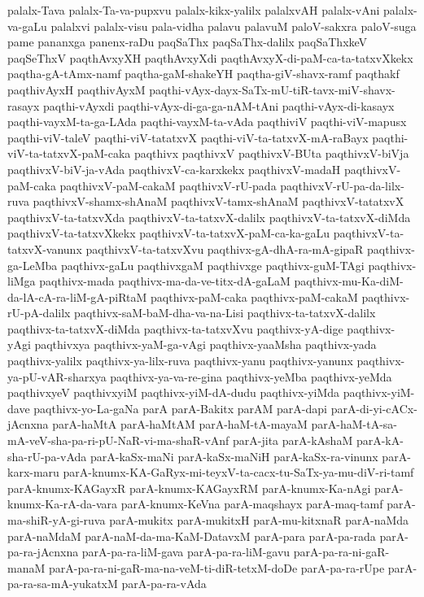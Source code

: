 {palalx-Tava
palalx-Ta-va-pupxvu
palalx-kikx-yalilx
palalxvAH
palalx-vAni
palalx-va-gaLu
palalxvi
palalx-visu
pala-vidha
palavu
palavuM
paloV-sakxra
paloV-suga
pame
pananxga
panenx-raDu
paqSaThx
paqSaThx-dalilx
paqSaThxkeV
paqSeThxV
paqthAvxyXH
paqthAvxyXdi
paqthAvxyX-di-paM-ca-ta-tatxvXkekx
paqtha-gA-tAmx-namf
paqtha-gaM-shakeYH
paqtha-giV-shavx-ramf
paqthakf
paqthivAyxH
paqthivAyxM
paqthi-vAyx-dayx-SaTx-mU-tiR-tavx-miV-shavx-rasayx
paqthi-vAyxdi
paqthi-vAyx-di-ga-ga-nAM-tAni
paqthi-vAyx-di-kasayx
paqthi-vayxM-ta-ga-LAda
paqthi-vayxM-ta-vAda
paqthiviV
paqthi-viV-mapusx
paqthi-viV-taleV
paqthi-viV-tatatxvX
paqthi-viV-ta-tatxvX-mA-raBayx
paqthi-viV-ta-tatxvX-paM-caka
paqthivx
paqthivxV
paqthivxV-BUta
paqthivxV-biVja
paqthivxV-biV-ja-vAda
paqthivxV-ca-karxkekx
paqthivxV-madaH
paqthivxV-paM-caka
paqthivxV-paM-cakaM
paqthivxV-rU-pada
paqthivxV-rU-pa-da-lilx-ruva
paqthivxV-shamx-shAnaM
paqthivxV-tamx-shAnaM
paqthivxV-tatatxvX
paqthivxV-ta-tatxvXda
paqthivxV-ta-tatxvX-dalilx
paqthivxV-ta-tatxvX-diMda
paqthivxV-ta-tatxvXkekx
paqthivxV-ta-tatxvX-paM-ca-ka-gaLu
paqthivxV-ta-tatxvX-vanunx
paqthivxV-ta-tatxvXvu
paqthivx-gA-dhA-ra-mA-gipaR
paqthivx-ga-LeMba
paqthivx-gaLu
paqthivxgaM
paqthivxge
paqthivx-guM-TAgi
paqthivx-liMga
paqthivx-mada
paqthivx-ma-da-ve-titx-dA-gaLaM
paqthivx-mu-Ka-diM-da-lA-cA-ra-liM-gA-piRtaM
paqthivx-paM-caka
paqthivx-paM-cakaM
paqthivx-rU-pA-dalilx
paqthivx-saM-baM-dha-va-na-Lisi
paqthivx-ta-tatxvX-dalilx
paqthivx-ta-tatxvX-diMda
paqthivx-ta-tatxvXvu
paqthivx-yA-dige
paqthivx-yAgi
paqthivxya
paqthivx-yaM-ga-vAgi
paqthivx-yaaMsha
paqthivx-yada
paqthivx-yalilx
paqthivx-ya-lilx-ruva
paqthivx-yanu
paqthivx-yanunx
paqthivx-ya-pU-vAR-sharxya
paqthivx-ya-va-re-gina
paqthivx-yeMba
paqthivx-yeMda
paqthivxyeV
paqthivxyiM
paqthivx-yiM-dA-dudu
paqthivx-yiMda
paqthivx-yiM-dave
paqthivx-yo-La-gaNa
parA
parA-Bakitx
parAM
parA-dapi
parA-di-yi-cACx-jAcnxna
parA-haMtA
parA-haMtAM
parA-haM-tA-mayaM
parA-haM-tA-sa-mA-veV-sha-pa-ri-pU-NaR-vi-ma-shaR-vAnf
parA-jita
parA-kAshaM
parA-kA-sha-rU-pa-vAda
parA-kaSx-maNi
parA-kaSx-maNiH
parA-kaSx-ra-vinunx
parA-karx-maru
parA-knumx-KA-GaRyx-mi-teyxV-ta-cacx-tu-SaTx-ya-mu-diV-ri-tamf
parA-knumx-KAGayxR
parA-knumx-KAGayxRM
parA-knumx-Ka-nAgi
parA-knumx-Ka-rA-da-vara
parA-knumx-KeVna
parA-maqshayx
parA-maq-tamf
parA-ma-shiR-yA-gi-ruva
parA-mukitx
parA-mukitxH
parA-mu-kitxnaR
parA-naMda
parA-naMdaM
parA-naM-da-ma-KaM-DatavxM
parA-para
parA-pa-rada
parA-pa-ra-jAcnxna
parA-pa-ra-liM-gava
parA-pa-ra-liM-gavu
parA-pa-ra-ni-gaR-manaM
parA-pa-ra-ni-gaR-ma-na-veM-ti-diR-tetxM-doDe
parA-pa-ra-rUpe
parA-pa-ra-sa-mA-yukatxM
parA-pa-ra-vAda
}
